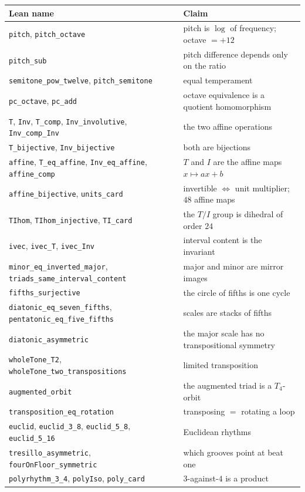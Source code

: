 \documentclass[11pt,a4paper]{article}
\newcommand{\lean}[1]{\texttt{#1}}
\begin{document}
\begin{center}
\begin{tabular}{@{}ll@{}}
\toprule
Lean name & Claim\\
\midrule
\lean{pitch}, \lean{pitch\_octave} & pitch is $\log$ of frequency; octave $=+12$\\
\lean{pitch\_sub}                  & pitch difference depends only on the ratio\\
\lean{semitone\_pow\_twelve}, \lean{pitch\_semitone} & equal temperament\\
\lean{pc\_octave}, \lean{pc\_add}  & octave equivalence is a quotient homomorphism\\
\lean{T}, \lean{Inv}, \lean{T\_comp}, \lean{Inv\_involutive}, \lean{Inv\_comp\_Inv} & the two affine operations\\
\lean{T\_bijective}, \lean{Inv\_bijective} & both are bijections\\
\lean{affine}, \lean{T\_eq\_affine}, \lean{Inv\_eq\_affine}, \lean{affine\_comp} & $T$ and $I$ are the affine maps $x\mapsto ax+b$\\
\lean{affine\_bijective}, \lean{units\_card} & invertible $\iff$ unit multiplier; $48$ affine maps\\
\lean{TIhom}, \lean{TIhom\_injective}, \lean{TI\_card} & the $T/I$ group is dihedral of order $24$\\
\lean{ivec}, \lean{ivec\_T}, \lean{ivec\_Inv} & interval content is the invariant\\
\lean{minor\_eq\_inverted\_major}, \lean{triads\_same\_interval\_content} & major and minor are mirror images\\
\lean{fifths\_surjective} & the circle of fifths is one cycle\\
\lean{diatonic\_eq\_seven\_fifths}, \lean{pentatonic\_eq\_five\_fifths} & scales are stacks of fifths\\
\lean{diatonic\_asymmetric} & the major scale has no transpositional symmetry\\
\lean{wholeTone\_T2}, \lean{wholeTone\_two\_transpositions} & limited transposition\\
\lean{augmented\_orbit} & the augmented triad is a $T_4$-orbit\\
\lean{transposition\_eq\_rotation} & transposing $=$ rotating a loop\\
\lean{euclid}, \lean{euclid\_3\_8}, \lean{euclid\_5\_8}, \lean{euclid\_5\_16} & Euclidean rhythms\\
\lean{tresillo\_asymmetric}, \lean{fourOnFloor\_symmetric} & which grooves point at beat one\\
\lean{polyrhythm\_3\_4}, \lean{polyIso}, \lean{poly\_card} & $3$-against-$4$ is a product\\
\bottomrule
\end{tabular}
\end{center}
\end{document}
